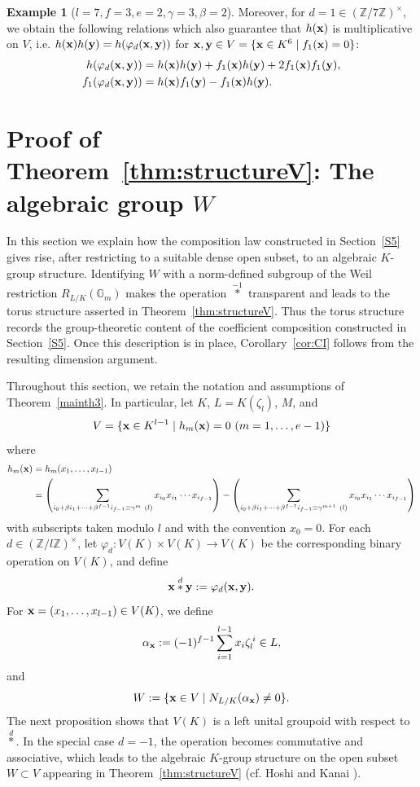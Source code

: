 \documentclass[a4paper, 11pt]{amsart}
\newcommand{\Z}{\mathbb Z}
\theoremstyle{plain}
\theoremstyle{definition}
\newtheorem{example}[thm]{Example}
\numberwithin{equation}{section}
\begin{document}
\begin{example}[$l=7, f=3, e=2, \gamma =3, \beta =2$]
Moreover, for $d=1\in (\Z/7\Z)^\times$, 
we obtain the following relations 
which also guarantee that $h({\bf x})$ is multiplicative on $V$, i.e. 
$h({\bf x})h({\bf y})=h(\varphi_d({\bf x}, {\bf y}))$ for 
${\bf x},{\bf y} \in V=\{{\bf x}\in K^6\mid f_1({\bf x})=0\}$:
\begin{align*}
h(\varphi_d({\bf x},{\bf y}))&=
h({\bf x})h({\bf y})+f_1({\bf x})h({\bf y})+2f_1({\bf x})f_1({\bf y}),\\
f_1(\varphi_d({\bf x},{\bf y}))&=
h({\bf x})f_1({\bf y})-f_1({\bf x})h({\bf y}).
\end{align*}
\end{example}

\section{Proof of Theorem~\ref{thm:structureV}: The algebraic group $W$}\label{S6}

In this section we explain how the composition law constructed in Section~\ref{S5} gives rise, after restricting to a suitable dense open subset, to an algebraic $K$-group structure. 
Identifying $W$ with a norm-defined subgroup of the Weil restriction $R_{L/K}(\mathbb{G}_m)$ makes the operation $\overset{-1}{\ast}$ transparent and leads to the torus structure asserted in Theorem~\ref{thm:structureV}. 
Thus the torus structure records the group-theoretic content of the coefficient composition constructed in Section~\ref{S5}.
Once this description is in place, Corollary~\ref{cor:CI} follows from the resulting dimension argument.

Throughout this section, we retain the notation and assumptions of Theorem~\ref{mainth3}.
In particular, let $K$, $L=K(\zeta_l)$, $M$, and
\[
V=\{{\bf x}\in K^{l-1}\mid h_m({\bf x})=0 \ (m=1,\dots,e-1)\}
\]
where
\begin{align*}
h_m({\bf x})&=h_m(x_1,\ldots,x_{l-1})\\
&=\left(\sum_{i_0 + \beta i_1 + \cdots +\beta^{f-1}i_{f-1} \equiv \gamma^m \ (l)}x_{i_0}x_{i_1}\cdots x_{i_{f-1}}\right) - \left(\sum_{i_0 + \beta i_1 + \cdots +\beta^{f-1}i_{f-1} \equiv \gamma^{m+1} \ (l)}x_{i_0}x_{i_1}\cdots x_{i_{f-1}}\right)
\end{align*}
with subscripts taken modulo $l$ and with the convention $x_0=0$. 
For each $d\in(\Z/l\Z)^{\times}$, let
$
\varphi_d: V(K)\times V(K)\to V(K)
$
be the corresponding binary operation on $V(K)$, and define
\[
{\bf x}\overset d\ast {\bf y}:=\varphi_d({\bf x},{\bf y}).
\]
For ${\bf x}=(x_1,\dots,x_{l-1})\in V(K)$, we define
\[
\alpha_{\bf x}:=(-1)^{f-1}\sum_{i=1}^{l-1}x_i\zeta_l^{\,i}\in L,
\]
and
\[
W:=\{{\bf x}\in V\mid N_{L/K}(\alpha_{\bf x})\neq 0\}.
\]
The next proposition shows that $V(K)$ is a left unital groupoid with respect to $\overset{d}{\ast}$. 
In the special case $d=-1$, the operation becomes commutative and associative, which leads to the algebraic $K$-group structure on the open subset $W\subset V$ appearing in Theorem~\ref{thm:structureV} (cf. Hoshi and Kanai \cite[Section 3]{HK22}).
\end{document}

